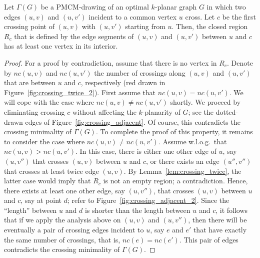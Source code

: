 \begin{lemma}
Let $\Gamma(G)$ be a PMCM-drawing of an optimal $k$-planar graph $G$ in which two edges $(u,v)$ and $(u,v')$ incident to a common vertex $u$ cross. Let $c$ be the first crossing point of $(u,v)$ with $(u,v')$ starting from $u$. Then, the closed region $R_{c}$ that is defined by the edge segments of $(u,v)$ and $(u,v')$ between $u$ and $c$ has at least one vertex in its interior.
\label{lem:crossing_adjacent}
\end{lemma}
\begin{proof}
For a proof by contradiction, assume that there is no vertex in $R_{c}$. Denote by $nc(u,v)$ and $nc(u,v')$ the number of crossings along $(u,v)$ and $(u,v')$ that are between $u$ and $c$, respectively (red drawn in Figure~\ref{fig:crossing_twice_2}). First assume that $nc(u,v) = nc(u,v')$. We will cope with the case where $nc(u,v) \neq nc(u,v')$ shortly. We proceed by eliminating crossing $c$ without affecting the $k$-planarity of $G$; see the dotted-drawn edges of Figure~\ref{fig:crossing_adjacent}. Of course, this contradicts the crossing minimality of $\Gamma(G)$. To complete the proof of this property, it remains to consider the case where $nc(u,v) \neq nc(u,v')$. Assume w.l.o.g.~that $nc(u,v) > nc(u,v')$. In this case, there is either one other edge of $u$, say $(u,v'')$ that crosses $(u,v)$ between $u$ and $c$, or there exists an edge $(u'',v'')$ that crosses at least twice edge $(u,v)$. By Lemma~\ref{lem:crossing_twice}, the latter case would imply that $R_{c}$ is not an empty region; a contradiction. Hence, there exists at least one other edge, say $(u,v'')$, that crosses $(u,v)$ between $u$ and $c$, say at point $d$; refer to Figure~\ref{fig:crossing_adjacent_2}. Since the ``length'' between $u$ and $d$ is shorter than the length between $u$ and $c$, it follows that if we apply the analysis above on $(u,v)$ and $(u,v'')$, then there will be eventually a pair of crossing edges incident to $u$, say $e$ and $e'$ that have exactly the same number of crossings, that is, $nc(e) = nc(e')$. This pair of edges contradicts the crossing minimality of $\Gamma(G)$.   
\end{proof}





